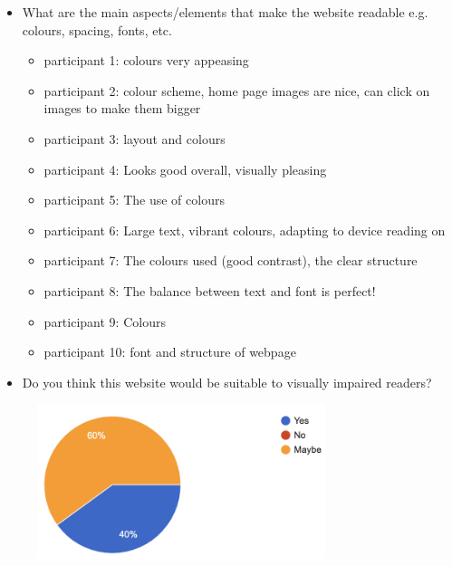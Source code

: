 \documentclass[letterpaper,12pt]{article}
\begin{document}
\begin{appendices}
\begin{itemize}
    \item What are the main aspects/elements that make the website readable e.g. colours, spacing, fonts, etc.
    \begin{itemize}
        \item 	participant 1: 	colours very appeasing 
    \item 	participant 2: 	colour scheme, home page images are nice, can click on images to make them bigger
    \item 	participant 3: 	layout and colours
    \item 	participant 4: 	Looks good overall, visually pleasing
    \item 	participant 5: 	The use of colours 
    \item 	participant 6: 	Large text, vibrant colours, adapting to device reading on
    \item 	participant 7: 	The colours used (good contrast), the clear structure
    \item 	participant 8: 	The balance between text and font is perfect!
    \item 	participant 9: 	Colours
    \item 	participant 10: 	font and structure of webpage
    \end{itemize}
\end{itemize}

\begin{itemize}
    \item Do you think this website would be suitable to visually impaired readers?
\end{itemize}

\begin{figure}[h] 
\centerline{\includegraphics[width=0.75\textwidth]{report/images/user-survey-visually-impaired.png}}
{\label{fig:user-survey-visually-impaired}}
\end{figure}


\end{appendices}
\end{document}

